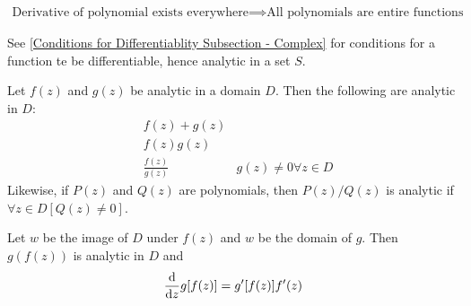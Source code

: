 \documentclass[12pt, english]{book}
\begin{document}
	\begin{example}
		\begin{align*}
			\text{Derivative of polynomial exists everywhere} \implies \text{All polynomials are entire functions}
		\end{align*}
	\end{example}
	
	See \cref{Conditions for Differentiablity Subsection - Complex} for conditions for a function te be differentiable, hence analytic in a set \(S\).
	
	\begin{corollary}
		Let \(f(z)\) and \(g(z)\) be analytic in a domain \(D\). Then the following are analytic in \(D\):
		\begin{align*}
			&f(z)  + g(z) 		& \\
			&f(z)g(z)	 		& \\
			&\frac{f(z)}{g(z)} 	& g(z) \neq 0 \forall z \in D
		\end{align*}
		Likewise, if \(P(z)\) and \(Q(z)\) are polynomials, then \(P(z)/Q(z)\) is analytic if \(\forall z \in D[Q(z) \neq 0]\).
	\end{corollary}

	\begin{corollary}
		Let \(w\) be the image of \(D\) under \(f(z)\) and \(w\) be the domain of \(g\). Then \(g(f(z))\) is analytic in \(D\) and 
		\begin{align*}
			\dv{z} g[f(z)] = g'[f(z)]f'(z)
		\end{align*}
	\end{corollary}
\end{document}
